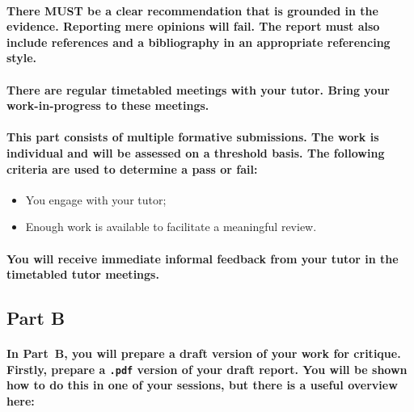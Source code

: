 \documentclass{../../fal_assignment}
\begin{document}
\paragraph{There \textbf{MUST} be a clear recommendation that is grounded in the evidence. Reporting mere opinions will fail. The report must also include references and a bibliography in an appropriate referencing style.}


\paragraph{
There are regular timetabled meetings with your tutor. Bring your work-in-progress to these meetings. 
}

\paragraph{This part consists of \textbf{multiple formative submissions}. The work is \textbf{individual} and will be assessed on a \textbf{threshold} basis. The following criteria are used to determine a pass or fail:}

\begin{itemize}
	\item You engage with your tutor;
	\item Enough work is available to facilitate a meaningful review.
\end{itemize}

\paragraph{
You will receive \textbf{immediate informal feedback} from your tutor in the timetabled tutor meetings.
 }
 
\subsection*{Part B}

\paragraph{In Part~B, you will prepare a draft version of your work for critique. Firstly, prepare a \texttt{.pdf} version of your draft report. You will be shown how to do this in one of your sessions, but there is a useful overview here:}
\end{document}
